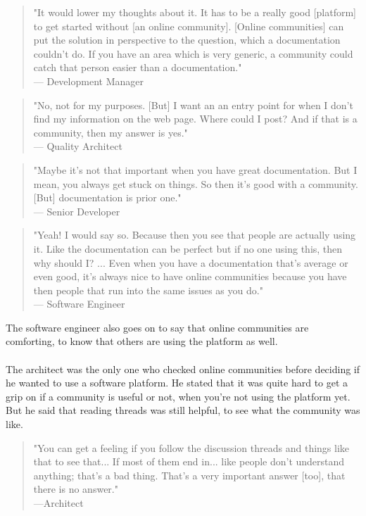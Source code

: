\documentclass{cslthse-msc}
\begin{document}
    \begin{quote}
        "It would lower my thoughts about it. It has to be a really good [platform] to get started without [an online community]. [Online communities] can put the solution in perspective to the question, which a documentation couldn't do. If you have an area which is very generic, a community could catch that person easier than a documentation."\\--- Development Manager
    \end{quote}
    \begin{quote}
        "No, not for my purposes. [But] I want an an entry point for when I don't find my information on the web page. Where could I post? And if that is a community, then my answer is yes."\\ --- Quality Architect
    \end{quote}
    \begin{quote}
        "Maybe it's not that important when you have great documentation. But I mean, you always get stuck on things. So then it's good with a community. [But] documentation is prior one."\\--- Senior Developer
    \end{quote}
    \begin{quote}
        "Yeah! I would say so. Because then you see that people are actually using it. Like the documentation can be perfect but if no one using this, then why should I? ...
        Even when you have a documentation that's average or even good, it's always nice  to have online communities because you have then people that run into the same issues as you do." \\--- Software Engineer
    \end{quote}
    The software engineer also goes on to say that online communities are comforting, to know that others are using the platform as well.
    \\ \\
    The architect was the only one who checked online communities before deciding if he wanted to use a software platform. He stated that it was quite hard to get a grip on if a community is useful or not, when you're not using the platform yet. But he said that reading threads was still helpful, to see what the community was like.
    \begin{quote}
        "You can get a feeling if you follow the discussion threads and things like that to see that... If most of them end in... like people don't understand anything; that's a bad thing. That's a very important answer [too], that there is no answer."\\---Architect
    \end{quote}
\end{document}
